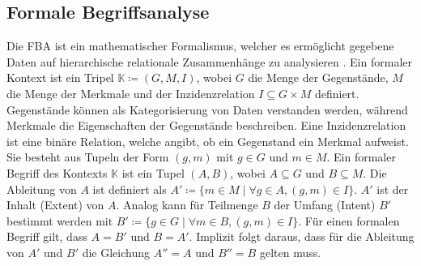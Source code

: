 \subsection{Formale Begriffsanalyse}
Die \ac{FBA} ist ein mathematischer Formalismus, welcher es ermöglicht gegebene Daten auf hierarchische relationale Zusammenhänge zu analysieren \cite{formale-begriffsanalyse, formal-concept-analysis-wille}.
Ein formaler Kontext ist ein Tripel $\mathbb{K} \coloneqq (G, M, I)$, wobei $G$ die Menge der Gegenstände, $M$ die Menge der Merkmale und der Inzidenzrelation $I \subseteq G \times M$ definiert.
Gegenstände können als Kategorisierung von Daten verstanden werden, während Merkmale die Eigenschaften der Gegenstände beschreiben.
Eine Inzidenzrelation ist eine binäre Relation, welche angibt, ob ein Gegenstand ein Merkmal aufweist.
Sie besteht aus Tupeln der Form $(g,m)$ mit $g \in G$ und $m \in M$.
Ein formaler Begriff des Kontexts $\mathbb{K}$ ist ein Tupel $(A,B)$, wobei $A \subseteq G$ und $B \subseteq M$.
Die Ableitung von $A$ ist definiert als $A' \coloneqq \{m \in M \mid \forall g \in A, (g,m) \in I\}$.
$A'$ ist der Inhalt (Extent) von $A$.
Analog kann für Teilmenge $B$ der Umfang (Intent) $B'$ bestimmt werden mit $B' \coloneqq \{g \in G \mid \forall m \in B, (g,m) \in I\}$.
Für einen formalen Begriff gilt, dass $A = B'$ und $B = A'$.
Implizit folgt daraus, dass für die Ableitung von $A'$ und $B'$ die Gleichung $A'' = A$ und $B'' = B$ gelten muss.\\

\begin{center}
    \begin{table}[!ht]
        \centering
        \caption{Kreuztabelle - Nahrungsmittel}
        \label{table:fca-food}
    \end{table}
\end{center}

